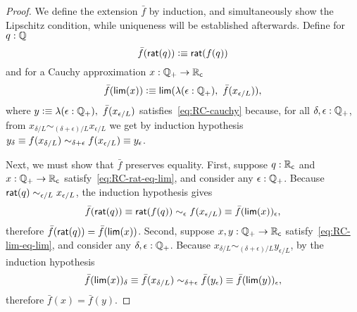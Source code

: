 \begin{proof}
  We define the extension $\bar{f}$ by induction, and simultaneously show the Lipschitz
  condition, while uniqueness will be established afterwards. Define for $q : \mathbb{Q}$
  \begin{equation*}
    \bar{f}(\mathsf{rat}(q)) \vcentcolon\equiv \mathsf{rat}(f(q))
  \end{equation*}
  and for a Cauchy approximation $x : \mathbb{Q}_{+} \to \mathbb{R}_\mathsf{c}$
  \begin{equation*}
    \bar{f}(\rclim(x)) \defeq \rclim(\lam{\epsilon : \Qp} \bar{f}(x_{\epsilon/L})),
  \end{equation*}
  where $y \defeq \lam{\epsilon : \Qp} \bar{f}(x_{\epsilon/L})$
  satisfies~\eqref{eq:RC-cauchy} because, for all $\delta, \epsilon : \mathbb{Q}_{+}$, from
  $x_{\delta/L} \sim_{(\delta + \epsilon)/L} x_{\epsilon/L}$ we get by induction
  hypothesis $y_\delta \equiv f(x_{\delta/L}) \sim_{\delta + \epsilon} f(x_{\epsilon/L})
  \equiv y_\epsilon$.

  Next, we must show that $\bar{f}$ preserves equality. First, suppose $q : \mathbb{R}_\mathsf{c}$ and
  $x : \mathbb{Q}_{+} \to \mathbb{R}_\mathsf{c}$ satisfy~\eqref{eq:RC-rat-eq-lim}, and consider any $\epsilon : \mathbb{Q}_{+}$.
  Because $\mathsf{rat}(q) \sim_{\epsilon/L} x_{\epsilon/L}$, the induction hypothesis gives
  \begin{equation*}
    \bar{f}(\mathsf{rat}(q)) \equiv \mathsf{rat}(f(q))
    \sim_{\epsilon} f(x_{\epsilon/L}) \equiv \bar{f}(\mathsf{lim}(x))_\epsilon,
  \end{equation*}
  therefore $\bar{f}(\mathsf{rat}(q)) = \bar{f}(\mathsf{lim}(x))$. Second, suppose $x, y : \mathbb{Q}_{+} \to
  \mathbb{R}_\mathsf{c}$ satisfy~\eqref{eq:RC-lim-eq-lim}, and consider any $\delta, \epsilon : \mathbb{Q}_{+}$.
  Because $x_{\delta/L} \sim_{(\delta + \epsilon)/L} y_{\epsilon/L}$, by the induction
  hypothesis
  \begin{equation*}
    \bar{f}(\mathsf{lim}(x))_\delta \equiv \bar{f}(x_{\delta/L}) \sim_{\delta + \epsilon}
    \bar{f}(y_{\epsilon}) \equiv \bar{f}(\mathsf{lim}(y))_\epsilon,
  \end{equation*}
  therefore $\bar{f}(x) = \bar{f}(y)$.


\end{proof}
